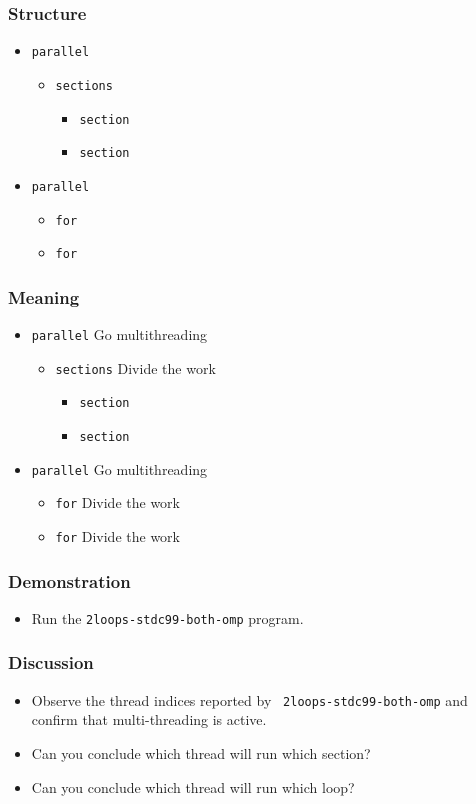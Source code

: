 \documentclass{beamer}
\begin{document}
\begin{frame}
\frametitle{Structure}
\begin{itemize}
\item {\tt parallel}
\begin{itemize}
\item {\tt sections}
\begin{itemize}
\item {\tt section}
\item {\tt section}
\end{itemize}
\end{itemize}
\item {\tt parallel}
\begin{itemize}
\item {\tt for}
\item {\tt for}
\end{itemize}
\end{itemize}
\end{frame}

\begin{frame}
\frametitle{Meaning}
\begin{itemize}
\item {\tt parallel} Go multithreading
\begin{itemize} 
\item {\tt sections} Divide the work
\begin{itemize}
\item {\tt section} 
\item {\tt section}
\end{itemize}
\end{itemize}
\item {\tt parallel} Go multithreading
\begin{itemize}
\item {\tt for}  Divide the work
\item {\tt for}  Divide the work
\end{itemize}
\end{itemize}
\end{frame}

\begin{frame}
  \frametitle{Demonstration}
  \begin{itemize}
  \item Run the {\tt 2loops-stdc99-both-omp} program.
  \end{itemize}
\end{frame}

\begin{frame}
  \frametitle{Discussion}
  \begin{itemize}
  \item Observe the thread indices reported by {\tt
    2loops-stdc99-both-omp} and confirm that multi-threading is
    active.
  \item Can you conclude which thread will run which section?
  \item Can you conclude which thread will run which loop?
  \end{itemize}
\end{frame}
\end{document}

